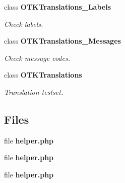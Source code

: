 \begin{DoxyCompactItemize}
class {\bf OTKTranslations\_\-Labels}
\begin{DoxyCompactList}\small\item\em Check labels. \end{DoxyCompactList}\item 
class {\bf OTKTranslations\_\-Messages}
\begin{DoxyCompactList}\small\item\em Check message codes. \end{DoxyCompactList}\item 
class {\bf OTKTranslations}
\begin{DoxyCompactList}\small\item\em Translation testset. \end{DoxyCompactList}\end{DoxyCompactItemize}
\subsection*{Files}
\begin{DoxyCompactItemize}
\item 
file {\bf helper.php}
\item 
file {\bf helper.php}
\item 
file {\bf helper.php}
\end{DoxyCompactItemize}
